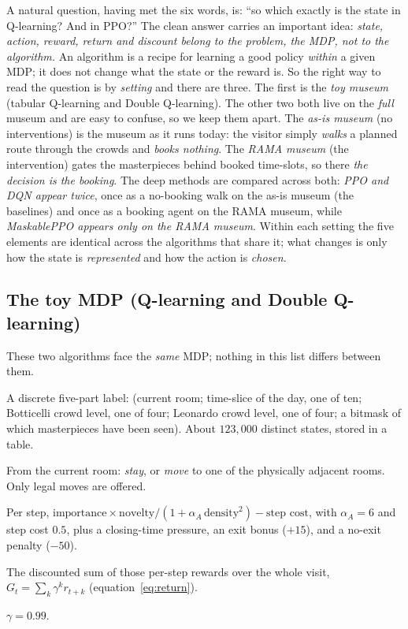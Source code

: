 \documentclass[11pt]{article}
\newcommand{\key}[1]{\textit{#1}}            %
\begin{document}
A natural question, having met the six words, is: ``so which exactly is the state in
Q-learning? And in PPO?'' The clean answer carries an important idea:
\emph{state, action, reward, return and discount belong to the problem, the MDP, not to the
algorithm.} An algorithm is a recipe for learning a good policy \emph{within} a given MDP; it
does not change what the state or the reward is. So the right way to read the question is by
\emph{setting} and there are three. The first is the \key{toy museum} (tabular Q-learning and
Double Q-learning). The other two both live on the \emph{full} museum and are easy to confuse,
so we keep them apart. The \key{as-is museum} (no interventions) is the museum as it runs
today: the visitor simply \emph{walks} a planned route through the crowds and \emph{books
nothing}. The \key{RAMA museum} (the intervention) gates the masterpieces behind booked
time-slots, so there \emph{the decision is the booking}. The deep methods are compared across
both: \emph{PPO and DQN appear twice}, once as a no-booking walk on the as-is museum (the
baselines) and once as a booking agent on the RAMA museum, while \emph{MaskablePPO appears
only on the RAMA museum}. Within each setting the five elements are identical across the
algorithms that share it; what changes is only how the state is \emph{represented} and how the
action is \emph{chosen}.

\subsection{The toy MDP (Q-learning and Double Q-learning)}

These two algorithms face the \emph{same} MDP; nothing in this list differs between them.
\begin{description}[leftmargin=0pt,style=nextline,itemsep=2pt]
\item[State] A discrete five-part label: (current room; time-slice of the day, one of ten;
Botticelli crowd level, one of four; Leonardo crowd level, one of four; a bitmask of which
masterpieces have been seen). About $123{,}000$ distinct states, stored in a table.
\item[Action] From the current room: \emph{stay}, or \emph{move} to one of the physically
adjacent rooms. Only legal moves are offered.
\item[Reward] Per step,
$\text{importance}\times\text{novelty}/(1+\alpha_A\,\text{density}^2)-\text{step cost}$,
with $\alpha_A = 6$ and step cost $0.5$, plus a closing-time pressure, an exit bonus ($+15$),
and a no-exit penalty ($-50$).
\item[Return] The discounted sum of those per-step rewards over the whole visit,
$G_t = \sum_k \gamma^k r_{t+k}$ (equation~\eqref{eq:return}).
\item[Discount] $\gamma = 0.99$.
\end{description}
\end{document}
